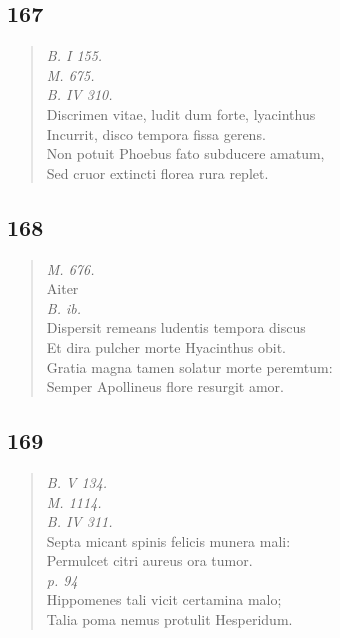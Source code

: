 \documentclass[11pt, a4paper]{report}
\begin{document}
            \subsection*{167}
      \begin{verse}
      \textit{B. I 155.} \\ \textit{M. 675.} \\ \textit{B. IV 310.} \\ Discrimen vitae, ludit dum forte, lyacinthus \\ Incurrit, disco tempora fissa gerens. \\ Non potuit Phoebus fato subducere amatum, \\ Sed cruor extincti florea rura replet. \\ 
      \end{verse}
  
            \subsection*{168}
      \begin{verse}
      \textit{M. 676.} \\  \lbrack Aiter \rbrack  \\ \textit{B. ib.} \\ Dispersit remeans ludentis tempora discus \\ Et dira pulcher morte Hyacinthus obit. \\ Gratia magna tamen solatur morte peremtum: \\ Semper Apollineus flore resurgit amor. \\ 
      \end{verse}
  
            \subsection*{169}
      \begin{verse}
      \textit{B. V 134.} \\ \textit{M. 1114.} \\ \textit{B. IV 311.} \\ Septa micant spinis felicis munera mali: \\ Permulcet citri aureus ora tumor. \\ \textit{p. 94} \\ Hippomenes tali vicit certamina malo; \\ Talia poma nemus protulit Hesperidum. \\ 
      \end{verse}
  
\end{document}
